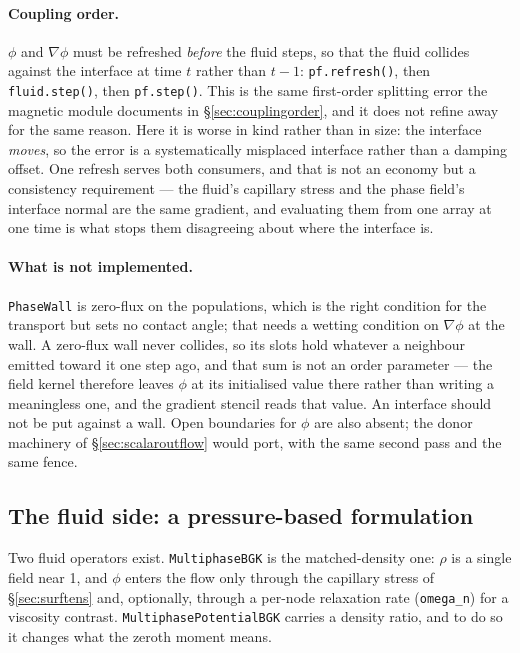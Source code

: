 \documentclass[11pt,a4paper]{article}
\newcommand{\code}[1]{\texttt{\small #1}}
\begin{document}
\paragraph{Coupling order.} $\phi$ and $\nabla\phi$ must be refreshed
\emph{before} the fluid steps, so that the fluid collides against the interface
at time $t$ rather than $t-1$:
\code{pf.refresh()}, then \code{fluid.step()}, then \code{pf.step()}. This is the
same first-order splitting error the magnetic module documents in
\S\ref{sec:couplingorder}, and it does not refine away for the same reason. Here
it is worse in kind rather than in size: the interface \emph{moves}, so the
error is a systematically misplaced interface rather than a damping offset. One
refresh serves both consumers, and that is not an economy but a consistency
requirement --- the fluid's capillary stress and the phase field's interface
normal are the same gradient, and evaluating them from one array at one time is
what stops them disagreeing about where the interface is.

\paragraph{What is not implemented.} \code{PhaseWall} is zero-flux on the
populations, which is the right condition for the transport but sets no contact
angle; that needs a wetting condition on $\nabla\phi$ at the wall. A zero-flux
wall never collides, so its slots hold whatever a neighbour emitted toward it one
step ago, and that sum is not an order parameter --- the field kernel therefore
leaves $\phi$ at its initialised value there rather than writing a meaningless
one, and the gradient stencil reads that value. An interface should not be put
against a wall. Open boundaries for $\phi$ are also absent; the donor machinery
of \S\ref{sec:scalaroutflow} would port, with the same second pass and the same
fence.


\subsection{The fluid side: a pressure-based formulation}
\label{sec:pressureform}

Two fluid operators exist. \code{MultiphaseBGK} is the matched-density one: $\rho$
is a single field near 1, and $\phi$ enters the flow only through the capillary
stress of \S\ref{sec:surftens} and, optionally, through a per-node relaxation
rate (\code{omega\_n}) for a viscosity contrast. \code{MultiphasePotentialBGK}
carries a density ratio, and to do so it changes what the zeroth moment means.
\end{document}
